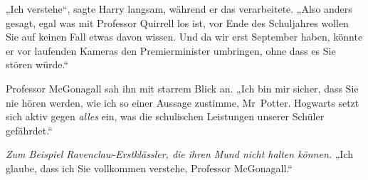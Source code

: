 „Ich verstehe“, sagte Harry langsam, während er das verarbeitete. „Also anders gesagt, egal was mit Professor Quirrell los ist, vor Ende des Schuljahres wollen Sie auf keinen Fall etwas davon wissen. Und da wir erst September haben, könnte er vor laufenden Kameras den Premierminister umbringen, ohne dass es Sie stören würde.“

Professor McGonagall sah ihn mit starrem Blick an. „Ich bin mir sicher, dass Sie nie hören werden, wie ich so einer Aussage zustimme, Mr~Potter. Hogwarts setzt sich aktiv gegen \emph{alles} ein, was die schulischen Leistungen unserer Schüler gefährdet.“

\emph{Zum Beispiel Ravenclaw-Erstklässler, die ihren Mund nicht halten können.} „Ich glaube, dass ich Sie vollkommen verstehe, Professor McGonagall.“

